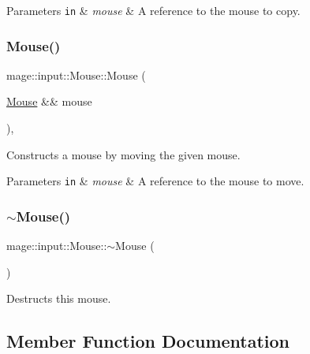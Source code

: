 \begin{DoxyParams}[1]{Parameters}
\mbox{\tt in}  & {\em mouse} & A reference to the mouse to copy. \\
\hline
\end{DoxyParams}
\mbox{\label{classmage_1_1input_1_1_mouse_a6e8185b9b2f0fdcd63a191389eb2b050}} 
\subsubsection{\texorpdfstring{Mouse()}{Mouse()}\hspace{0.1cm}{\footnotesize\ttfamily [3/3]}}
{\footnotesize\ttfamily mage\+::input\+::\+Mouse\+::\+Mouse (\begin{DoxyParamCaption}\item[{\mbox{\hyperlink{classmage_1_1input_1_1_mouse}{Mouse}} \&\&}]{mouse }\end{DoxyParamCaption})\hspace{0.3cm}{\ttfamily [default]}, {\ttfamily [noexcept]}}

Constructs a mouse by moving the given mouse.


\begin{DoxyParams}[1]{Parameters}
\mbox{\tt in}  & {\em mouse} & A reference to the mouse to move. \\
\hline
\end{DoxyParams}
\mbox{\label{classmage_1_1input_1_1_mouse_abfc6391c896b029e38ffa1341dcf9963}} 
\subsubsection{\texorpdfstring{$\sim$\+Mouse()}{~Mouse()}}
{\footnotesize\ttfamily mage\+::input\+::\+Mouse\+::$\sim$\+Mouse (\begin{DoxyParamCaption}{ }\end{DoxyParamCaption})\hspace{0.3cm}{\ttfamily [default]}}

Destructs this mouse. 

\subsection{Member Function Documentation}
\mbox{\label{classmage_1_1input_1_1_mouse_a6f789e976d80c6f9c92388e3cf3502d6}} 
